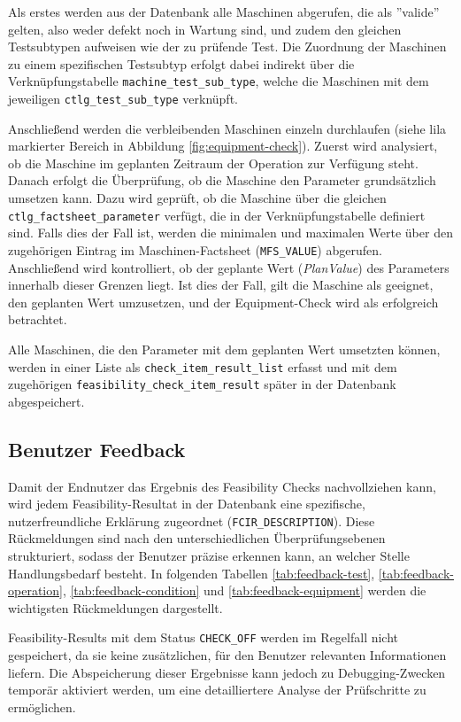 Als erstes werden aus der Datenbank alle Maschinen abgerufen, die als ''valide'' gelten, also weder defekt noch in Wartung sind, und zudem den gleichen Testsubtypen aufweisen wie der zu prüfende Test. Die Zuordnung der Maschinen zu einem spezifischen Testsubtyp erfolgt dabei indirekt über die Verknüpfungstabelle \texttt{machine\_test\_sub\_type}, welche die Maschinen mit dem jeweiligen \texttt{ctlg\_test\_sub\_type} verknüpft.

Anschließend werden die verbleibenden Maschinen einzeln durchlaufen (siehe lila markierter Bereich in Abbildung \ref{fig:equipment-check}). Zuerst wird analysiert, ob die Maschine im geplanten Zeitraum der Operation zur Verfügung steht. Danach erfolgt die Überprüfung, ob die Maschine den Parameter grundsätzlich umsetzen kann. Dazu wird geprüft, ob die Maschine über die gleichen \texttt{ctlg\_factsheet\_parameter} verfügt, die in der Verknüpfungstabelle definiert sind. Falls dies der Fall ist, werden die minimalen und maximalen Werte über den zugehörigen Eintrag im Maschinen-Factsheet (\texttt{MFS\_VALUE}) abgerufen. Anschließend wird kontrolliert, ob der geplante Wert (\textit{PlanValue}) des Parameters innerhalb dieser Grenzen liegt. Ist dies der Fall, gilt die Maschine als geeignet, den geplanten Wert umzusetzen, und der Equipment-Check wird als erfolgreich betrachtet.

Alle Maschinen, die den Parameter mit dem geplanten Wert umsetzten können, werden in einer Liste als \texttt{check\_item\_result\_list} erfasst und mit dem zugehörigen \texttt{feasibility\_check\_item\_result} später in der Datenbank abgespeichert. 


\subsection{Benutzer Feedback}

Damit der Endnutzer das Ergebnis des Feasibility Checks nachvollziehen kann, wird jedem Feasibility-Resultat in der Datenbank eine spezifische, nutzerfreundliche Erklärung zugeordnet (\texttt{FCIR\_DESCRIPTION}). Diese Rückmeldungen sind nach den unterschiedlichen Überprüfungsebenen strukturiert, sodass der Benutzer präzise erkennen kann, an welcher Stelle Handlungsbedarf besteht. In folgenden Tabellen \ref{tab:feedback-test}, \ref{tab:feedback-operation}, \ref{tab:feedback-condition} und \ref{tab:feedback-equipment} werden die wichtigsten Rückmeldungen dargestellt.

Feasibility-Results mit dem Status \texttt{CHECK\_OFF} werden im Regelfall nicht gespeichert, da sie keine zusätzlichen, für den Benutzer relevanten Informationen liefern. Die Abspeicherung dieser Ergebnisse kann jedoch zu Debugging-Zwecken temporär aktiviert werden, um eine detailliertere Analyse der Prüfschritte zu ermöglichen.


